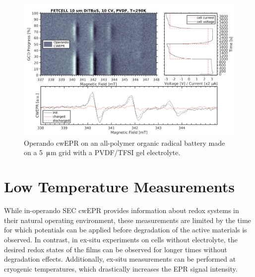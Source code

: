 \begin{figure}[h]
\center
	\includegraphics[width=1\textwidth]{./operando_epr/figures/solid/FET231114_5uA_RT.pdf}
	\caption{Operando cwEPR on an all-polymer organic radical battery made on a 5~$\muup$m grid with a PVDF/TFSI gel electrolyte.}
	\label{fig:operando_solid_battery}
\end{figure}

\section{Low Temperature Measurements}
\label{sec:low_T}
%
While in-operando SEC cwEPR provides information about redox systems in their natural operating environment, these measurements are limited by the time for which potentials can be applied before degradation of the active materials is observed. In contrast, in ex-situ experiments on cells without electrolyte, the desired redox states of the films can be observed for longer times without degradation effects. Additionally, ex-situ measurements can be performed at cryogenic temperatures, which drastically increases the EPR signal intensity.
%

